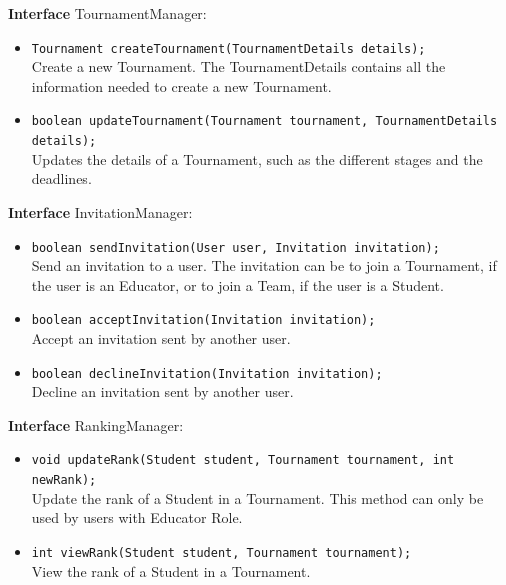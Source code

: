 \textbf{Interface} TournamentManager:
\begin{itemize}
    \item \texttt{Tournament createTournament(TournamentDetails details);}
    \\ Create a new Tournament. The TournamentDetails contains all the information needed to create a new Tournament.
    \item \texttt{boolean updateTournament(Tournament tournament, TournamentDetails details);}
    \\ Updates the details of a Tournament, such as the different stages and the deadlines.
\end{itemize}

\textbf{Interface} InvitationManager:
\begin{itemize}
    \item \texttt{boolean sendInvitation(User user, Invitation invitation);}
    \\ Send an invitation to a user. The invitation can be to join a Tournament, if the user is an Educator, or to join a Team, if the user is a Student.
    \item \texttt{boolean acceptInvitation(Invitation invitation);}
    \\ Accept an invitation sent by another user.
    \item \texttt{boolean declineInvitation(Invitation invitation);}
    \\ Decline an invitation sent by another user.
\end{itemize}

\textbf{Interface} RankingManager:
\begin{itemize}
    \item \texttt{void updateRank(Student student, Tournament tournament, int newRank);}
    \\ Update the rank of a Student in a Tournament. This method can only be used by users with Educator Role.
    \item \texttt{int viewRank(Student student, Tournament tournament);}
    \\ View the rank of a Student in a Tournament.
\end{itemize}

